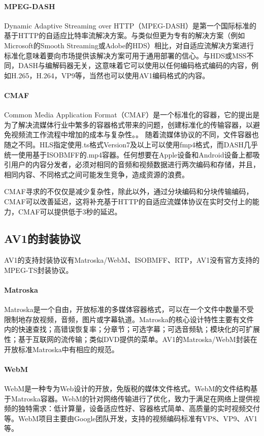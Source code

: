 \paragraph{MPEG-DASH} Dynamic Adaptive Streaming over HTTP（MPEG-DASH）是第一个国际标准的基于HTTP的自适应比特率流解决方案。与类似但更为专有的解决方案（例如Microsoft的Smooth Streaming或Adobe的HDS）相比，对自适应流解决方案进行标准化意味着要向市场提供该解决方案可用于通用部署的信心。与HDS或MSS不同，DASH与编解码器无关，这意味着它可以使用以任何编码格式编码的内容，例如H.265，H.264，VP9等，当然也可以使用AV1编码格式的内容。

\paragraph{CMAF} Common Media Application Format（CMAF）是一个标准化的容器，它的提出是为了解决流媒体行业中繁多的容器格式带来的问题，创建标准化的传输容器，以避免视频流工作流程中增加的成本与复杂性。。 随着流媒体协议的不同，文件容器也随之不同。HLS指定使用.ts格式Version7及以上可以使用fmp4格式，而DASH几乎统一使用基于ISOBMFF的.mp4容器。任何想要在Apple设备和Android设备上都吸引用户的内容分发者，必须对相同的音频和视频数据进行两次编码和存储，并且，相同内容、不同格式之间可能发生竞争，造成资源的浪费。

CMAF寻求的不仅仅是减少复杂性，除此以外，通过分块编码和分块传输编码，CMAF可以改善延迟，这将补充基于HTTP的自适应流媒体协议在实时交付上的能力，CMAF可以提供低于3秒的延迟。

\subsection{AV1的封装协议}

AV1的支持封装协议有Matroska/WebM、ISOBMFF、RTP，AV1没有官方支持的MPEG-TS封装协议。

\paragraph{Matroska} Matroska是一个自由，开放标准的多媒体容器格式，可以在一个文件中数量不受限制地存放视频，音频，图片或字幕轨道。Matroska的核心设计特性主要有文件内的快速查找；高错误恢复率；分章节；可选字幕；可选音频轨；模块化的可扩展性；基于互联网的流传输；类似DVD提供的菜单。AV1的Matroska/WebM封装在开放标准Matroska中有相应的规范\cite{AOMAV1Codec}。

\paragraph{WebM} WebM是一种专为Web设计的开放，免版税的媒体文件格式。WebM的文件结构基于Matroska容器。WebM的针对网络传输进行了优化，致力于满足在网络上提供视频的独特需求：低计算量，设备适应性好、容器格式简单、高质量的实时视频交付等。WebM项目主要由Google团队开发，支持的视频编码标准有VP8、VP9、AV1等。

